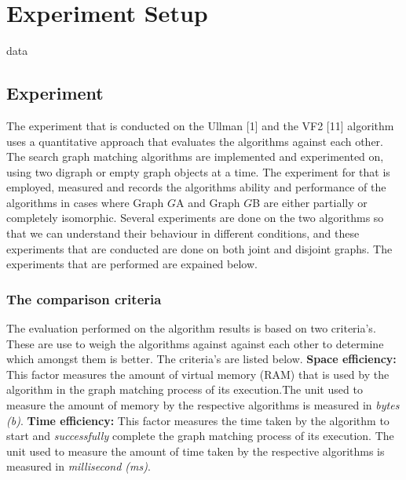 \section{Experiment Setup}
\label{Experimentation}

{data}

\subsection{Experiment}
The experiment that is conducted on the Ullman [1] and the VF2 [11] algorithm uses a quantitative approach that evaluates the algorithms against each 
other. The search graph matching algorithms are implemented and experimented on, using two digraph or empty graph objects at a time. The experiment for that is 
employed, measured and records the algorithms ability and performance of the algorithms in cases where Graph $G${\tiny A} and Graph $G${\tiny B} are 
either partially or completely isomorphic.\newline\newline
Several experiments are done on the two algorithms so that we can understand their behaviour in different conditions, and these experiments that are conducted 
are done on both joint and disjoint graphs. The experiments that are performed are expained below.

\subsubsection{The comparison criteria}
\label{The comparison criteria}
The evaluation performed on the algorithm results is based on two criteria's. These are use to weigh the algorithms against against each other to determine which amongst them is better. The criteria's are listed below.\newline\newline
\textbf{Space efficiency:} This factor measures the amount of virtual memory (RAM) that is used by the algorithm in the graph matching process of its
execution.The unit used to measure the amount of memory  by the respective algorithms is measured in \textit{bytes (b)}. \newline\newline
\textbf{Time efficiency:} This factor measures the time taken by the algorithm to start and \textit{successfully} complete the graph matching process of its
execution. The unit used to measure the amount of time taken by the respective algorithms is measured in \textit{millisecond (ms)}. 

